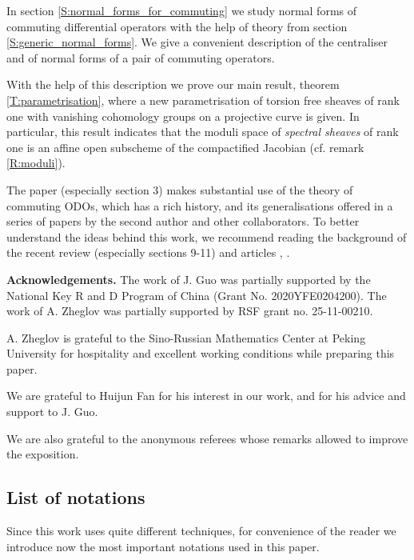 \documentclass[11pt]{article}
\theoremstyle{definition}
\theoremstyle{plain}
\numberwithin{equation}{section}
\begin{document}
In section \ref{S:normal_forms_for_commuting}  we study normal forms of commuting differential operators with the help of theory from section \ref{S:generic_normal_forms}. We give a convenient description of the centraliser and of normal forms of a pair of commuting operators. 

With the help of this description  we prove our main result, theorem \ref{T:parametrisation}, where a new parametrisation of torsion free sheaves of rank one with vanishing cohomology groups on a projective  curve is given.  In particular, this result indicates that the moduli space of {\it spectral sheaves} of rank one is an affine open subscheme of the compactified Jacobian (cf. remark \ref{R:moduli}).

 The paper (especially section 3) makes substantial use of the theory of commuting ODOs, which has a rich history, and its generalisations offered in a series of papers by the second author and other collaborators. To better understand the ideas behind this work, we recommend reading the background of the recent review \cite{Zheglov_book} (especially sections 9-11) and articles \cite{BurbanZheglov2017}, \cite{A.Z}.


{\bf Acknowledgements.}  The work of J. Guo was partially supported by the National Key R and D Program of China (Grant No. 2020YFE0204200). The work of A. Zheglov was partially supported by RSF grant no. 25-11-00210. 

A. Zheglov is grateful to the Sino-Russian Mathematics Center at Peking University for hospitality and excellent working conditions while preparing this paper.

We are grateful to Huijun Fan for his interest in our work, and for his advice and support to J. Guo. 

We are also grateful to the anonymous referees whose remarks allowed to improve the exposition.


\subsection{List of notations}

 Since this work uses quite different techniques, for convenience of the reader we introduce now the most important notations used in this paper.
 
\end{document}
